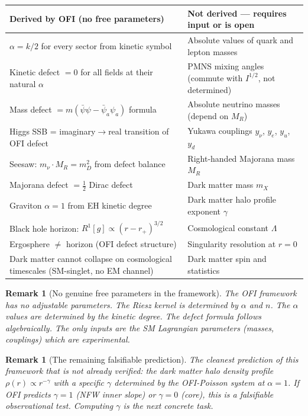 \documentclass[12pt]{article}
\newtheorem{remark}[theorem]{Remark}
\theoremstyle{definition}
\begin{document}
\begin{center}
\begin{tabular}{p{} p{}}
\toprule
\textbf{Derived by OFI (no free parameters)} & \textbf{Not derived — requires input or is open} \\
\midrule
$\alpha = k/2$ for every sector from kinetic symbol & Absolute values of quark and lepton masses \\
\addlinespace
Kinetic defect $= 0$ for all fields at their natural $\alpha$ & PMNS mixing angles (commute with $I^{1/2}$, not determined) \\
\addlinespace
Mass defect $= m(\bar\psi\psi - \bar\psi_a\psi_a)$ formula & Absolute neutrino masses (depend on $M_R$) \\
\addlinespace
Higgs SSB = imaginary$\to$real transition of OFI defect & Yukawa couplings $y_\nu$, $y_e$, $y_u$, $y_d$ \\
\addlinespace
Seesaw: $m_\nu \cdot M_R = m_D^2$ from defect balance & Right-handed Majorana mass $M_R$ \\
\addlinespace
Majorana defect $= \tfrac{1}{2}$ Dirac defect & Dark matter mass $m_X$ \\
\addlinespace
Graviton $\alpha = 1$ from EH kinetic degree & Dark matter halo profile exponent $\gamma$ \\
\addlinespace
Black hole horizon: $R^1[g] \propto (r-r_+)^{3/2}$ & Cosmological constant $\Lambda$ \\
\addlinespace
Ergosphere $\neq$ horizon (OFI defect structure) & Singularity resolution at $r=0$ \\
\addlinespace
Dark matter cannot collapse on cosmological timescales (SM-singlet, no EM channel) & Dark matter spin and statistics \\
\bottomrule
\end{tabular}
\end{center}

\begin{remark}[No genuine free parameters in the framework]
The OFI framework has no adjustable parameters.  The Riesz kernel is
determined by $\alpha$ and $n$.  The $\alpha$ values are determined by the
kinetic degree.  The defect formula follows algebraically.  The only inputs
are the SM Lagrangian parameters (masses, couplings) which are experimental.
\end{remark}

\begin{remark}[The remaining falsifiable prediction]
The cleanest prediction of this framework that is not already verified:
the dark matter halo density profile $\rho(r) \propto r^{-\gamma}$ with
a specific $\gamma$ determined by the OFI-Poisson system at $\alpha=1$.
If OFI predicts $\gamma = 1$ (NFW inner slope) or $\gamma = 0$ (core),
this is a falsifiable observational test.  Computing $\gamma$ is the next
concrete task.
\end{remark}
\end{document}
